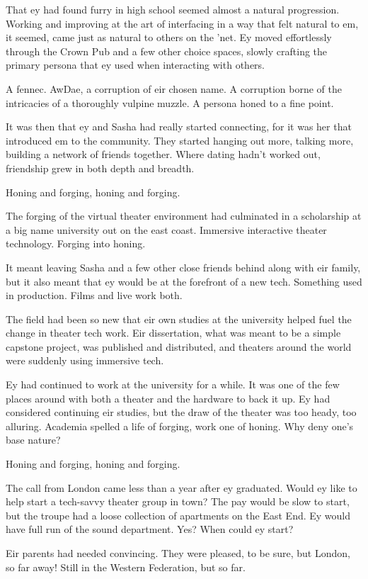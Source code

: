 That ey had found furry in high school seemed almost a natural progression. Working and improving at the art of interfacing in a way that felt natural to em, it seemed, came just as natural to others on the 'net. Ey moved effortlessly through the Crown Pub and a few other choice spaces, slowly crafting the primary persona that ey used when interacting with others.

A fennec. AwDae, a corruption of eir chosen name. A corruption borne of the intricacies of a thoroughly vulpine muzzle. A persona honed to a fine point.

It was then that ey and Sasha had really started connecting, for it was her that introduced em to the community. They started hanging out more, talking more, building a network of friends together. Where dating hadn't worked out, friendship grew in both depth and breadth.

Honing and forging, honing and forging.

The forging of the virtual theater environment had culminated in a scholarship at a big name university out on the east coast. Immersive interactive theater technology. Forging into honing.

It meant leaving Sasha and a few other close friends behind along with eir family, but it also meant that ey would be at the forefront of a new tech. Something used in production. Films and live work both.

The field had been so new that eir own studies at the university helped fuel the change in theater tech work. Eir dissertation, what was meant to be a simple capstone project, was published and distributed, and theaters around the world were suddenly using immersive tech.

Ey had continued to work at the university for a while. It was one of the few places around with both a theater and the hardware to back it up. Ey had considered continuing eir studies, but the draw of the theater was too heady, too alluring. Academia spelled a life of forging, work one of honing. Why deny one's base nature?

Honing and forging, honing and forging.

The call from London came less than a year after ey graduated. Would ey like to help start a tech-savvy theater group in town? The pay would be slow to start, but the troupe had a loose collection of apartments on the East End. Ey would have full run of the sound department. Yes? When could ey start?

Eir parents had needed convincing. They were pleased, to be sure, but London, so far away! Still in the Western Federation, but so far.


